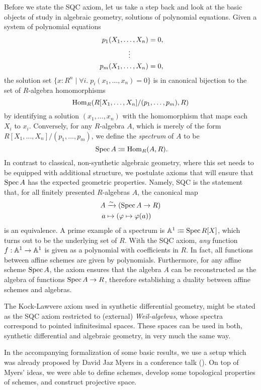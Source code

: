 \documentclass{../util/zariski}
\begin{document}
Before we state the SQC axiom, let us take a step back and look at the basic objects of study in algebraic geometry,
solutions of polynomial equations.
Given a system of polynomial equations
\begin{align*}
  p_1(X_1, \dots, X_n) &= 0\rlap{,} \\
  \vdots\quad\quad\;\;   \\
  p_m(X_1, \dots, X_n) &= 0\rlap{,}
\end{align*}
the solution set
$\{ x : R^n \mid \forall i.\; p_i(x_1, \dots, x_n) = 0 \}$
is in canonical bijection to the set of $R$-algebra homomorphisms
\[ \mathrm{Hom}_R(R[X_1, \dots, X_n]/(p_1, \dots, p_m), R) \]
by identifying a solution $(x_1,\dots,x_n)$ with the homomorphism that maps each $X_i$ to $x_i$.
Conversely, for any $R$-algebra $A$, which is merely of the form $R[X_1, \dots, X_n]/(p_1, \dots, p_m)$,
we define the \emph{spectrum} of $A$ to be
\[
  \Spec A \colonequiv \Hom_R(A, R)
  \rlap{.}
\]
In contrast to classical, non-synthetic algebraic geometry,
where this set needs to be equipped with additional structure,
we postulate axioms that will ensure that $\operatorname{Spec} A$ has the expected geometric properties.
Namely, SQC is the statement that, for all finitely presented $R$-algebras $A$, the canonical map
  \begin{align*}
    A&\xrightarrow{\sim} (\operatorname{Spec} A\to R) \\
    a&\mapsto (\varphi\mapsto \varphi(a))
  \end{align*}
is an equivalence.
A prime example of a spectrum is $\mathbb{A}^1\vcentcolon\mspace{-1.2mu}\equiv \operatorname{Spec} R[X]$,
which turns out to be the underlying set of $R$.
With the SQC axiom,
\emph{any} function $f:\mathbb{A}^1\to \mathbb{A}^1$ is given as a polynomial with coefficients in $R$.
In fact, all functions between affine schemes are given by polynomials.
Furthermore, for any affine scheme $\operatorname{Spec} A$,
the axiom ensures that
the algebra $A$ can be reconstructed as the algebra of functions $\operatorname{Spec} A \to R$,
therefore establishing a duality between affine schemes and algebras.

The Kock-Lawvere axiom used in synthetic differential geometry,
might be stated as the SQC axiom restricted to (external) \emph{Weil-algebras},
whose spectra correspond to pointed infinitesimal spaces.
These spaces can be used in both, synthetic differential and algebraic geometry,
in very much the same way.

In the accompanying formalization \cite{formalization} of some basic results,
we use a setup which was already proposed by David Jaz Myers
in a conference talk (\cite{myers-talk1, myers-talk2}).
On top of Myers' ideas,
we were able to define schemes, develop some topological properties of schemes,
and construct projective space.
\end{document}

